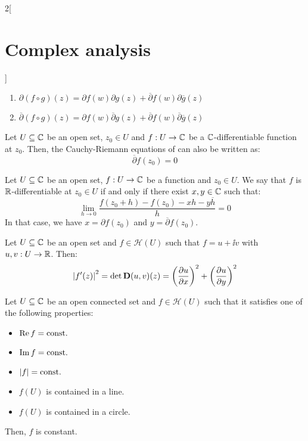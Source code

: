 \documentclass[../../../main_math.tex]{subfiles}
\begin{document}
\begin{multicols}{2}[\section{Complex analysis}]
\begin{proposition}
    \begin{enumerate}
      \item $\partial(f\circ g)(z)=\partial f(w)\partial g(z)+\overline{\partial}f(w)\partial \overline{g}(z)$
      \item $\overline{\partial}(f\circ g)(z)=\partial f(w)\overline{\partial} g(z)+\overline{\partial}f(w)\overline{\partial} \overline{g}(z)$
    \end{enumerate}
  \end{proposition}
  \begin{proposition}
    Let $U\subseteq \mathbb{C}$ be an open set, $z_0\in U$ and $f:U\rightarrow \mathbb{C}$ be a $\mathbb{C}$-differentiable function at $z_0$. Then, the Cauchy-Riemann equations of  can also be written as: $$\overline{\partial} f(z_0)=0$$
  \end{proposition}
  \begin{proposition}
    Let $U\subseteq \mathbb{C}$ be an open set, $f:U\rightarrow \mathbb{C}$ be a function and $z_0\in U$. We say that $f$ is $\mathbb{R}$-differentiable at $z_0\in U$ if and only if there exist $x,y\in \mathbb{C}$ such that: $$\lim_{h\to 0}\frac{f(z_0+h)-f(z_0)-xh-y\overline{h}}{h}=0$$
    In that case, we have $x=\partial f(z_0)$ and $y=\overline{\partial} f(z_0)$.
  \end{proposition}
  \begin{proposition}
    Let $U\subseteq \mathbb{C}$ be an open set and $f\in\mathcal{H}(U)$ such that $f=u+\ii v$ with $u,v:U\rightarrow\mathbb{R}$. Then:
    $${|f'(z)|}^2=\det \boldsymbol{\mathrm{D}}(u,v)(z)={\left(\pdv{u}{x}\right)}^2+{\left(\pdv{u}{y}\right)}^2$$
  \end{proposition}
  \begin{proposition}
    Let $U\subseteq \mathbb{C}$ be an open connected set and $f\in\mathcal{H}(U)$ such that it satisfies one of the following properties:
    \begin{itemize}
      \item $\Re f=\text{const.}$
      \item $\Im f=\text{const.}$
      \item $\abs{f}=\text{const.}$
      \item $f(U)$ is contained in a line.
      \item $f(U)$ is contained in a circle.
    \end{itemize}
    Then, $f$ is constant.
  \end{proposition}

\end{multicols}
\end{document}
